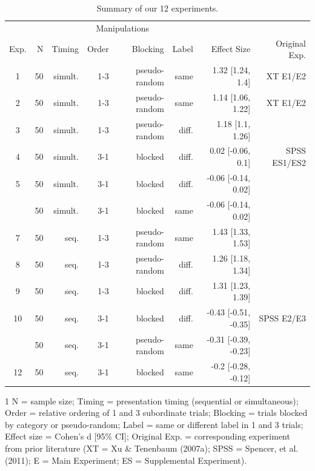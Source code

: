 \documentclass[english,floatsintext,man]{apa6}
\theoremstyle{definition}
\theoremstyle{definition}
\theoremstyle{remark}
\begin{document}
\begin{table}

\begin{threeparttable}
\caption{\label{tab:unnamed-chunk-2}Summary of our 12 experiments.}
\centering
\fontsize{12}{14}\selectfont
\begin{tabular}[t]{crrrrrrr}
\toprule
\multicolumn{2}{c}{ } & \multicolumn{4}{c}{Manipulations} & \multicolumn{1}{c}{ } \\
\cmidrule(l{2pt}r{2pt}){3-6}
Exp. & N & Timing & Order & Blocking & Label & Effect Size & Original 
Exp.\\
\midrule
1 & 50 & simult. & 1-3 & pseudo-random & same & 1.32 [1.24, 1.4] & XT E1/E2\\
2 & 50 & simult. & 1-3 & pseudo-random & same & 1.14 [1.06, 1.22] & XT E1/E2\\
3 & 50 & simult. & 1-3 & pseudo-random & diff. & 1.18 [1.1, 1.26] & \\
4 & 50 & simult. & 3-1 & blocked & diff. & 0.02 [-0.06, 0.1] & SPSS ES1/ES2\\
5 & 50 & simult. & 3-1 & blocked & diff. & -0.06 [-0.14, 0.02] & \\
\addlinespace
6 & 50 & simult. & 3-1 & blocked & same & -0.06 [-0.14, 0.02] & \\
7 & 50 & seq. & 1-3 & pseudo-random & same & 1.43 [1.33, 1.53] & \\
8 & 50 & seq. & 1-3 & pseudo-random & diff. & 1.26 [1.18, 1.34] & \\
9 & 50 & seq. & 1-3 & blocked & diff. & 1.31 [1.23, 1.39] & \\
10 & 50 & seq. & 3-1 & blocked & diff. & -0.43 [-0.51, -0.35] & SPSS E2/E3\\
\addlinespace
11 & 50 & seq. & 3-1 & pseudo-random & same & -0.31 [-0.39, -0.23] & \\
12 & 50 & seq. & 3-1 & blocked & same & -0.2 [-0.28, -0.12] & \\
\bottomrule
\end{tabular}
\begin{tablenotes}
\small
\item [1] N = sample size; Timing = presentation timing (sequential or simultaneous); Order = relative ordering of 1 and 3 subordinate trials; Blocking = trials blocked by category or pseudo-random; Label = same or different label in 1 and 3 trials; Effect size = Cohen's d [95\% CI]; Original Exp. = corresponding experiment from prior literature (XT = Xu \& Tenenbaum (2007a); SPSS =   Spencer, et al. (2011);  E = Main  Experiment; ES = Supplemental Experiment).
\end{tablenotes}
\end{threeparttable}
\end{table}
\end{document}
